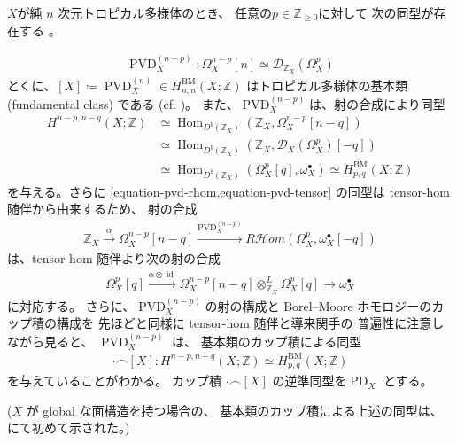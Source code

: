 \documentclass[a4paper,dvipdfmx,reqno,12pt]{amsart}
\theoremstyle{definition}
\newcommand{\deq}{\coloneqq}
\newcommand{\opn}[1]{\operatorname{#1}}
\newcommand{\xto}[1]{\xrightarrow{#1}}
\numberwithin{equation}{section}
\begin{document}
$X$が純 $n$ 次元トロピカル多様体のとき、
任意の$p\in\mathbb{Z}_{\geq 0}$に対して
次の同型が存在する
\cite[Theorem 6.2]{gross2019sheaftheoretic}。

\begin{align}
\opn{PVD}^{(n-p)}_X\colon \Omega_{X}^{n-p}[n]\simeq
\mathcal{D}_{\mathbb{Z}_X}(\Omega_X^{p})
\end{align}
とくに、$[X]\deq \opn{PVD}^{(n)}_X\in H_{n,n}^{\mathrm{BM}}
(X;\mathbb{Z})$
はトロピカル多様体の基本類(fundamental class)
である (cf. \cite[Definition 4.8]{MR3894860})。
また、$\opn{PVD}^{(n-p)}_X$は、射の合成により同型
\begin{align}
H^{n-p,n-q}(X;\mathbb{Z})& \simeq
\opn{Hom}_{D^{b}(\mathbb{Z}_X)}
(\mathbb{Z}_X,\Omega_X^{n-p}[n-q]) \\
& \simeq \opn{Hom}_{D^{b}(\mathbb{Z}_X)}
(\mathbb{Z}_X,\mathcal{D}_X(\Omega_X^{p})[-q])
\label{equation-pvd-rhom} \\
& \simeq \opn{Hom}_{D^{b}(\mathbb{Z}_X)}
(\Omega_X^{p}[q],\omega_X^{\bullet})
\simeq H_{p,q}^{\mathrm{BM}}(X;\mathbb{Z})
\label{equation-pvd-tensor}
\end{align}
を与える。さらに
\cref{equation-pvd-rhom,equation-pvd-tensor}
の同型は tensor-hom 随伴から由来するため、
射の合成
\begin{align}
\mathbb{Z}_X \xto{\alpha} \Omega_X^{n-p}[n-q] 
\xto{\opn{PVD}^{(n-p)}_X} 
R\mathcal{H}om (\Omega_X^{p},\omega_X^{\bullet}[-q])
\end{align}
は、tensor-hom 随伴より次の射の合成
\begin{align}
\Omega_X^{p}[q]\xto{\alpha \otimes \opn{id}} \Omega_X^{n-p}[n-q]\otimes^{L}_{\mathbb{Z}_X}
\Omega_X^{p}[q] \to\omega_X^{\bullet}
\end{align}
に対応する。
さらに、$\opn{PVD}^{(n-p)}_X$の射の構成と
Borel--Moore ホモロジーのカップ積の構成を
先ほどと同様に tensor-hom 随伴と導来関手の
普遍性に注意しながら見ると、
$\opn{PVD}^{(n-p)}_X$ は、
基本類のカップ積による同型
\begin{align}
\label{equation-cup-pd}
\cdot \frown [X]
\colon H^{n-p,n-q}(X;\mathbb{Z})\simeq
H^{\mathrm{BM}}_{p,q}(X;\mathbb{Z})
\end{align}
を与えていることがわかる。
カップ積 $\cdot \frown [X]$
の逆準同型を$\opn{PD}_X$ とする。

($X$ が global な面構造を持つ場合の、
基本類のカップ積による上述の同型は、
\cite[Theorem 5.3]{MR3894860} にて初めて示された。)
\end{document}
